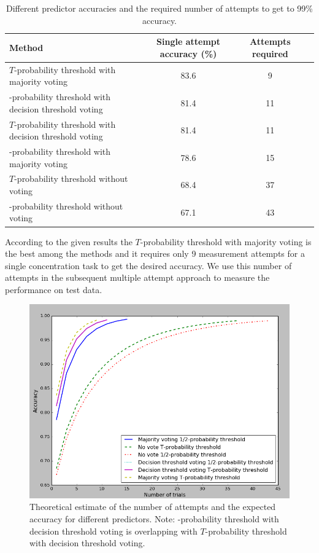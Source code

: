 \documentclass[12pt]{article}
\theoremstyle{definition}
\begin{document}
\begin{table}[H]
\label{tab:title} 
\begin{center}
  \begin{tabular}{ | l | c | c | c | }
    \hline
    Method & \parbox[c]{1.8cm}{\raggedright Single attempt accuracy (\%)} &\parbox[c]{1.8cm}{\raggedright Attempts required}\\ \hline
    $T$-probability threshold with majority voting & 83.6 & 9 \\ \hline
    -probability threshold with decision threshold voting & 81.4 & 11 \\ \hline
	$T$-probability threshold with decision threshold voting & 81.4 & 11 \\ \hline
	-probability threshold with majority voting & 78.6 & 15 \\ \hline
    $T$-probability threshold without voting & 68.4 & 37\\ \hline
    -probability threshold without voting & 67.1 & 43\\ \hline
  \end{tabular}
\end{center}
\caption{Different predictor accuracies and the required number of attempts to get to 99\% accuracy.}
\end{table}

According to the given results the $T$-probability threshold with majority voting is the best among the methods and it requires only 9 measurement attempts for a single concentration task to get the desired accuracy. We use this number of attempts in the subsequent multiple attempt approach to measure the performance on test data.

\begin{figure} [H]
\begin{center}
\includegraphics[width=1\textwidth]{condorcet_dependency_training}
\caption{Theoretical estimate of the number of attempts and the expected accuracy for different predictors. Note: -probability threshold with decision threshold voting is overlapping with $T$-probability threshold with decision threshold voting.}
\label{fig:fnCompModel}
\end{center}
\end{figure}
\end{document}
